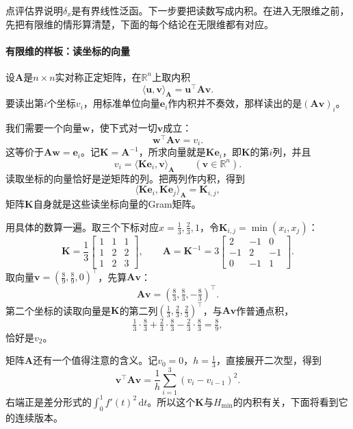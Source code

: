 点评估界说明$\delta_x$是有界线性泛函。下一步要把读数写成内积。在进入无限维之前，先把有限维的情形算清楚，下面的每个结论在无限维都有对应。

\paragraph{有限维的样板：读坐标的向量}

设$\bm A$是$n\times n$实对称正定矩阵，在$\mathbb R^n$上取内积
\[
\langle\bm u,\bm v\rangle_{\bm A}=\bm u^{\top}\bm A\bm v .
\]
要读出第$i$个坐标$v_i$，用标准单位向量$\bm e_i$作内积并不奏效，那样读出的是$(\bm A\bm v)_i$。

我们需要一个向量$\bm w$，使下式对一切$\bm v$成立：
\[
\bm w^{\top}\bm A\bm v=v_i .
\]
这等价于$\bm A\bm w=\bm e_i$。记$\bm K=\bm A^{-1}$，所求向量就是$\bm K\bm e_i$，即$\bm K$的第$i$列，并且
\begin{equation}
v_i=\langle\bm K\bm e_i,\bm v\rangle_{\bm A}\qquad(\bm v\in\mathbb R^n).
\label{eq:rkhs-finite-reproducing}
\end{equation}
读取坐标的向量恰好是逆矩阵的列。把两列作内积，得到
\[
\langle\bm K\bm e_i,\bm K\bm e_j\rangle_{\bm A}=\bm K_{i,j} ,
\]
矩阵$\bm K$自身就是这些读坐标向量的Gram矩阵。

用具体的数算一遍。取三个下标对应$x=\tfrac13,\tfrac23,1$，令$\bm K_{i,j}=\min(x_i,x_j)$：
\[
\bm K=\frac13\begin{bmatrix}1&1&1\\1&2&2\\1&2&3\end{bmatrix},\qquad
\bm A=\bm K^{-1}=3\begin{bmatrix}2&-1&0\\-1&2&-1\\0&-1&1\end{bmatrix}.
\]
取向量$\bm v=(\tfrac89,\tfrac89,0)^{\top}$，先算$\bm A\bm v$：
\[
\bm A\bm v=(\tfrac83,\tfrac83,-\tfrac83)^{\top}.
\]
第二个坐标的读取向量是$\bm K$的第二列$(\tfrac13,\tfrac23,\tfrac23)^{\top}$，与$\bm A\bm v$作普通点积，
\[
\tfrac13\cdot\tfrac83+\tfrac23\cdot\tfrac83-\tfrac23\cdot\tfrac83=\tfrac89,
\]
恰好是$v_2$。

矩阵$\bm A$还有一个值得注意的含义。记$v_0=0$，$h=\tfrac13$，直接展开二次型，得到
\begin{equation}
\bm v^{\top}\bm A\bm v=\frac1h\sum_{i=1}^3(v_i-v_{i-1})^2 .
\label{eq:rkhs-finite-difference-form}
\end{equation}
右端正是差分形式的$\int_0^1f'(t)^2\,\mathrm dt$。所以这个$\bm K$与$H_{\min}$的内积有关，下面将看到它的连续版本。


